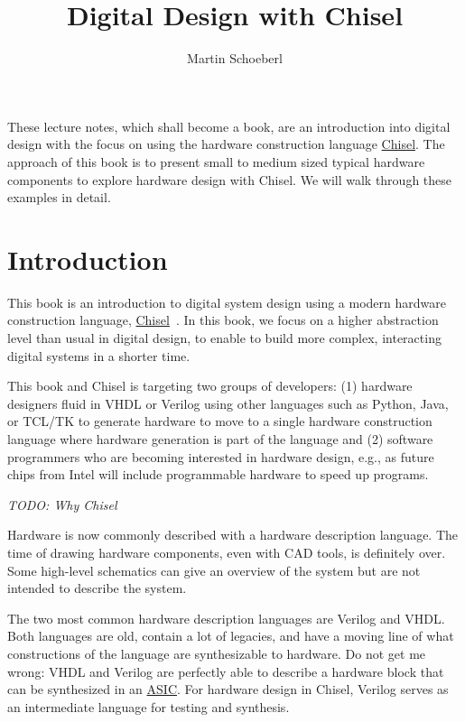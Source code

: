 \documentclass[%
    10pt, %
    headinclude, footexclude,
    openright, %
    notitlepage,
    cleardoubleempty,
    headsepline,
    pointlessnumbers,
    bibtotoc, idxtotoc,
    ]{scrbook}
\newcommand{\todo}[1]{{\emph{TODO: #1}}}
\newcommand{\myref}[2]{\href{#1}{#2}}
\begin{document}
\title{Digital Design with Chisel}

\author{Martin Schoeberl}

\maketitle \thispagestyle{empty}

These lecture notes, which shall become a book, are an introduction into digital design with the focus
on using the hardware construction language
\myref{https://chisel.eecs.berkeley.edu/}{Chisel}. The approach of this book
is to present small to medium sized typical hardware components to explore
hardware design with Chisel.
We will walk through these examples in detail.

\tableofcontents

\chapter{Introduction}
\label{sec:intro}

This book is an introduction to digital system design using a modern hardware
construction language, \myref{https://chisel.eecs.berkeley.edu/}{Chisel}~\cite{chisel:dac2012}.
In this book, we focus on a higher abstraction level than usual in digital design,
to enable to build more complex, interacting digital systems in a shorter time.

This book and Chisel is targeting two groups of developers:
(1) hardware designers fluid in VHDL or Verilog using other languages such as Python,
Java, or TCL/TK to generate hardware to move to a single hardware construction language
where hardware generation is part of the language and
(2) software programmers who are becoming interested in hardware design,
e.g., as future chips from Intel will include programmable hardware to speed up programs.

\todo{Why Chisel}

Hardware is now commonly described with a hardware description language.
The time of drawing hardware components, even with CAD tools, is definitely
over. Some high-level schematics can give an overview of the system but are
not intended to describe the system.

The two most common hardware description languages are Verilog and VHDL.
Both languages are old, contain a lot of legacies, and have a moving line of what
constructions of the language are synthesizable to hardware.
Do not get me wrong: VHDL and Verilog are perfectly able to describe a hardware
block that can be synthesized in an
\myref{https://en.wikipedia.org/wiki/Application-specific_integrated_circuit}{ASIC}.
For hardware design in Chisel, Verilog serves as an intermediate language
for testing and synthesis.
\end{document}

